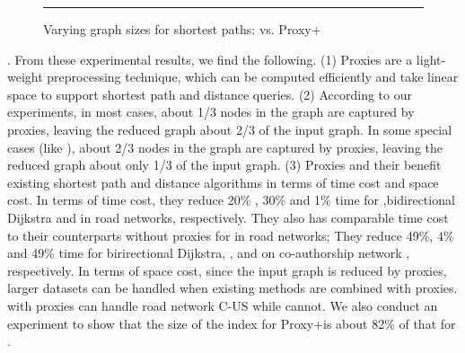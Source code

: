 \begin{figure}[tb!]
\begin{center}
\hspace{-4ex}\vspace{-1.5ex}
\end{center}
\vspace{1ex}
\caption{Varying graph sizes  for shortest paths: \ah vs. Proxy+\ah}
\label{fig:performance_path_graph_size_ah}
\hrule
\vspace{-1ex}
\end{figure}

\vspace{-0.5ex}
.
From these experimental results, we find the following. (1) Proxies are a light-weight preprocessing technique, which can be computed efficiently and take linear space to support shortest path and distance queries.  (2) According to our experiments, in most cases, about 1/3 nodes in the graph are captured by proxies, leaving the reduced graph about 2/3 of the input graph. In some special cases (like \dblpone), about 2/3 nodes in the graph are captured by proxies, leaving the reduced graph about only 1/3 of the input graph. (3) Proxies and their \dras benefit existing shortest path and distance algorithms in terms of time cost and space cost. In terms of time cost, \eg they reduce 20\% , 30\% and 1\% time for \arcflag ,bidirectional Dijkstra and \ah in road networks, respectively. They also has comparable time cost to their counterparts without proxies for \tnr in road networks; They reduce 49\%, 4\% and 49\% time for birirectional Dijkstra, \arcflag, and \tnr on co-authorship network \dblpone, respectively. In terms of space cost, since the input graph is reduced by proxies, larger datasets can be handled when existing methods are combined with proxies. \eg \tnr with proxies can handle road network C-US while \tnr cannot. We also conduct an experiment to show that the size of the index for Proxy+\ah is about 82\% of that for \ah.

